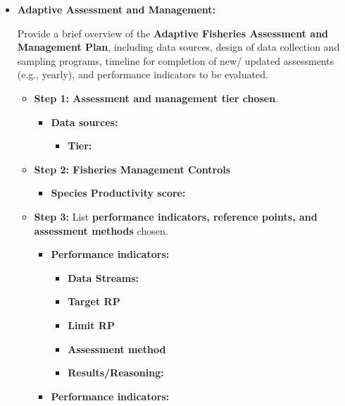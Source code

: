 \documentclass[]{book}
\providecommand{\tightlist}{%
  \setlength{\itemsep}{0pt}\setlength{\parskip}{0pt}}
\begin{document}
\begin{itemize}
\item
  \textbf{Adaptive Assessment and Management:}

  Provide a brief overview of the \textbf{Adaptive Fisheries Assessment
  and Management Plan}, including data sources, design of data
  collection and sampling programs, timeline for completion of new/
  updated assessments (e.g., yearly), and performance indicators to be
  evaluated.

  \begin{itemize}
  \item
    \textbf{Step 1: Assessment and management tier chosen}.

    \begin{itemize}
    \item
      \textbf{Data sources: }

      \begin{itemize}
      \tightlist
      \item
        \textbf{Tier:}
      \end{itemize}
    \end{itemize}
  \item
    \textbf{Step 2: Fisheries Management Controls}

    \begin{itemize}
    \tightlist
    \item
      \textbf{Species Productivity score:}
    \end{itemize}
  \item
    \textbf{Step 3:} List \textbf{performance indicators, reference
    points, and assessment methods} chosen.

    \begin{itemize}
    \item
      \textbf{Performance indicators: }

      \begin{itemize}
      \item
        \textbf{Data Streams:}
      \item
        \textbf{Target RP}
      \item
        \textbf{Limit RP}
      \item
        \textbf{Assessment method}
      \item
        \textbf{Results/Reasoning:}
      \end{itemize}
    \item
      \textbf{Performance indicators: }


\end{itemize}
\end{itemize}
\end{itemize}
\end{document}
